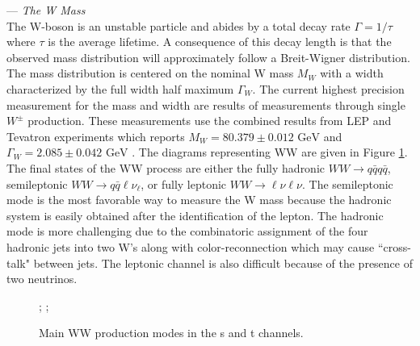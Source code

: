   
   

--- \textit {The W Mass}\\
The W-boson is an unstable particle and abides by a total decay rate $\Gamma = 1/\tau$ where $\tau$ is the average lifetime.  A consequence of this decay length is that the observed mass distribution will approximately follow a Breit-Wigner distribution. The mass distribution is centered on the nominal W mass $M_W$ with a width characterized by the full width half maximum $\Gamma_W$. The current highest precision measurement for the mass and width are results of measurements through single $W^\pm$ production. These measurements use the combined results from LEP and Tevatron experiments which reports $M_W = 80.379 \pm 0.012 \, \, \text{GeV} $ and $\Gamma_W = 2.085 \pm 0.042 \,  \,\text{GeV}$ \cite{pdg}. The diagrams representing WW are given in Figure \ref{fig:wwdiag}. The final states of the WW process are either the fully hadronic $WW\rightarrow q\bar{q}q\bar{q}$, semileptonic $WW\rightarrow q\bar{q}\ell\nu_{\ell}$, or fully leptonic $WW\rightarrow \ell \nu \ell \nu$. The semileptonic mode is the most favorable way to measure the W mass because the hadronic system is easily obtained after the identification of the lepton. The hadronic mode is more challenging due to the combinatoric assignment of the four hadronic jets into two W's along with color-reconnection which may cause ``cross-talk" between jets. The leptonic channel is also difficult because of the presence of two neutrinos.


\begin{figure}
\centering
{};
    ;
\caption{\label{fig:wwdiag} Main WW production modes in the s and t channels. }
\end{figure}

  

